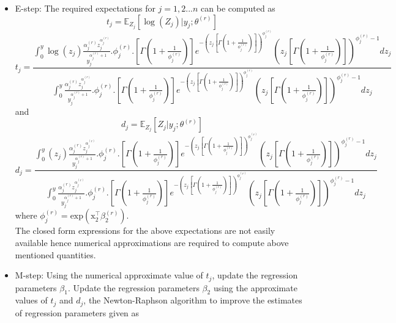 \documentclass[12pt]{article}%
\theoremstyle{definition}
\theoremstyle{remark}
\begin{document}
{\begin{itemize}
	\item E-step: The required expectations for $j=1,2...n$ can be computed as
	\begin{equation*}
		t_{j}=\mathbb{E}_{Z_{j}}\left[\log(Z_{j})|y_{j};\theta^{(r)}\right]
	\end{equation*}
	\begin{equation}
		t_{j}=\frac{\int_0^y \log(z_{j}) \frac{\alpha_{j}^{(r)} z_{j}^{\alpha_{j}^{(r)}} }{y_{j}^{\alpha_{j}^{(r)} +1}}.\phi^{(r)}_{j}.\left [\Gamma\left(1+\frac{1}{\phi^{(r)}_{j}}\right)\right]  e^{-\left(z_{j}\left [\Gamma(1+\frac{1}{\phi^{(r)}_{j}})\right]\right)^{\phi^{(r)}_{j}}}\left(z_{j}\left [\Gamma\left(1+\frac{1}{\phi^{(r)}_{j}}\right)\right]\right)^{\phi^{(r)}_{j}-1} dz_{j}}{\int_0^y  \frac{\alpha_{j}^{(r)} z_{j}^{\alpha_{j}^{(r)}} }{y_{j}^{\alpha_{j}^{(r)} +1}}.\phi^{(r)}_{j}.\left [\Gamma\left(1+\frac{1}{\phi^{(r)}_{j}}\right)\right]  e^{-\left(z_{j}\left [\Gamma(1+\frac{1}{\phi^{(r)}_{j}})\right]\right)^{\phi^{(r)}_{j}}}\left(z_{j}\left [\Gamma\left(1+\frac{1}{\phi^{(r)}_{j}}\right)\right]\right)^{\phi^{(r)}_{j}-1} dz_{j}}
	\end{equation}
	and
	\begin{equation*}
		d_{j}=\mathbb{E}_{Z_{j}}\left[Z_{j}|y_{j};\theta^{(r)}\right]
	\end{equation*}
	\begin{equation}
		d_{j}=\frac{\int_0^y (z_{j}) \frac{\alpha_{j}^{(r)} z_{j}^{\alpha_{j}^{(r)}} }{y_{j}^{\alpha_{j}^{(r)} +1}}.\phi^{(r)}_{j}.\left [\Gamma\left(1+\frac{1}{\phi^{(r)}_{j}}\right)\right]  e^{-\left(z_{j}\left [\Gamma(1+\frac{1}{\phi^{(r)}_{j}})\right]\right)^{\phi^{(r)}_{j}}}\left(z_{j}\left [\Gamma\left(1+\frac{1}{\phi^{(r)}_{j}}\right)\right]\right)^{\phi^{(r)}_{j}-1} dz_{j}}{\int_0^y  \frac{\alpha_{j}^{(r)} z_{j}^{\alpha_{j}^{(r)}} }{y_{j}^{\alpha_{j}^{(r)} +1}}.\phi^{(r)}_{j}.\left [\Gamma\left(1+\frac{1}{\phi^{(r)}_{j}}\right)\right]  e^{-\left(z_{j}\left [\Gamma(1+\frac{1}{\phi^{(r)}_{j}})\right]\right)^{\phi^{(r)}_{j}}}\left(z_{j}\left [\Gamma\left(1+\frac{1}{\phi^{(r)}_{j}}\right)\right]\right)^{\phi^{(r)}_{j}-1} dz_{j}}
	\end{equation}
	where $\phi^{(r)}_{j}=\text{exp}(\text{x}_{2}^{\top}\beta_{2}^{(r)})$.\\
	The closed form expressions for the above expectations are not easily available hence numerical approximations are required to compute above mentioned quantities.
	
	\item M-step: Using the numerical approximate value of $t_{j}$, update the regression parameters $\beta_{1}$. Update the regression parameters $\beta_{2}$ using the approximate values of $t_{j}$ and $d_{j}$, the Newton-Raphson algorithm to improve the estimates of regression parameters given as\\
	

\end{itemize}}
\end{document}
